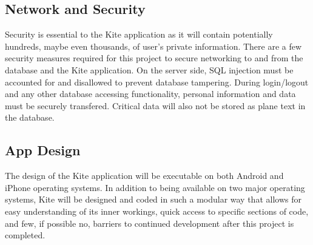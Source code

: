 \documentclass[letterpaper, 10, draftclsnofoot, onecolumn]{IEEEtran}
\begin{document}
\subsection{Network and Security}
	Security is essential to the Kite application as it will contain potentially hundreds, maybe even thousands, of user's private information. There are a few security measures required for this project to secure networking to and from the database and the Kite application. On the server side, SQL injection must be accounted for and disallowed to prevent database tampering. During login/logout and any other database accessing functionality, personal information and data must be securely transfered. Critical data will also not be stored as plane text in the database.   

\subsection{App Design}
\indent The design of the Kite application will be executable on both Android and iPhone operating systems. In addition to being available on two major operating systems, Kite will be  designed and coded in such a modular way that allows for easy understanding of its inner workings, quick access to specific sections of code, and few, if possible no, barriers to continued development after this project is completed.
\end{document}
